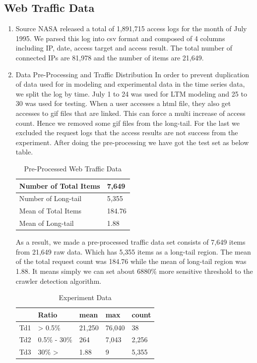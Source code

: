 \documentclass[sigconf,anonymous=true]{acmart}
\begin{document}
\subsection{Web Traffic Data}
\begin{enumerate}
\item Source
\newline NASA released a total of 1,891,715 access logs for the month of July 1995. We parsed this log into csv format and composed of 4 columns including IP, date, access target and access result.
The total number of connected IPs are 81,978 and the number of items are 21,649.
\newline

\item Data Pre-Processing and Traffic Distribution
\newline In order to prevent duplication of data used for in modeling and experimental data in the time series data, we split the log by time. July 1 to 24 was used for LTM modeling and 25 to 30 was used for testing.
When a user accesses a html file, they also get accesses to gif files that are linked. This can force a multi increase of access count. Hence we removed some gif files from the long-tail. For the last we excluded the request logs that the access results are not success from the experiment. After doing the pre-processing we have got the test set as below table.

\begin{table}[H]
  \caption{Pre-Processed Web Traffic Data}
  \label{tab:freq}
    \begin{tabular}{| p{3.1cm} | p{2cm} |}
    \hline
    Number of Total Items & 7,649 \\ \hline
    Number of Long-tail & 5,355 \\ \hline
    Mean of Total Items & 184.76 \\ \hline
    Mean of Long-tail & 1.88 \\ \hline
    \end{tabular}
\end{table}

As a result, we made a pre-processed traffic data set consists of 7,649 items from 21,649 raw data. Which has 5,355 items as a long-tail region. The mean of the total request count was 184.76 while the mean of long-tail region was 1.88. It means simply we can set about 6880\% more sensitive threshold to the crawler detection algorithm.\\ 

\begin{table}[H]
  \caption{Experiment Data}
    \begin{tabular}{| l | l | l | l | l | }
    \hline
    & Ratio & mean & max & count \\ \hline
    Td1 &  > 0.5\% & 21,250 & 76,040 & 38 \\ 
    Td2 & 0.5\% - 30\% & 264 & 7,043 & 2,256 \\
    Td3 & 30\% > & 1.88 & 9 & 5,355 \\ \hline
    \end{tabular}
\end{table}


\end{enumerate}
\end{document}
